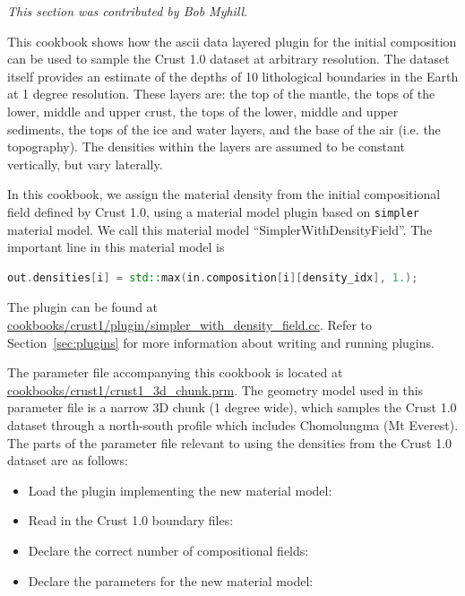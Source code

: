 \textit{This section was contributed by Bob Myhill}.

This cookbook shows how the ascii data layered plugin for the initial
composition can be used to sample the Crust 1.0 dataset \cite{laske2013update}
at arbitrary resolution.
The dataset itself provides an estimate of the depths of
10 lithological boundaries in the Earth at 1 degree resolution. These layers are:
the top of the mantle, the tops of the lower, middle and upper crust,
the tops of the lower, middle and upper sediments,
the tops of the ice and water layers, and the base of the air (i.e. the topography).
The densities within the layers are assumed to be constant vertically, but vary
laterally.

In this cookbook, we assign the material density from the initial compositional
field defined by Crust 1.0, using a material model plugin based on \texttt{simpler}
material model. We call this material model ``SimplerWithDensityField''.
The important line in this material model is
\begin{lstlisting}[frame=single,language=C++]
    out.densities[i] = std::max(in.composition[i][density_idx], 1.);
\end{lstlisting}

The plugin can be found at
\url{cookbooks/crust1/plugin/simpler_with_density_field.cc}. Refer to
Section~\ref{sec:plugins} for more information about writing and running
plugins.

The parameter file accompanying this cookbook is located at
\url{cookbooks/crust1/crust1_3d_chunk.prm}. The geometry model used in this
parameter file is a narrow 3D chunk (1 degree wide), which samples the Crust 1.0
dataset through a north-south profile which includes Chomolungma (Mt Everest).
The parts of the parameter file relevant to using the densities from the
Crust 1.0 dataset are as follows:
\begin{itemize}
  \item Load the plugin implementing the new material model:
  


  \item Read in the Crust 1.0 boundary files:
  


  \item Declare the correct number of compositional fields:
  


  \item Declare the parameters for the new material model:
  

\end{itemize}


